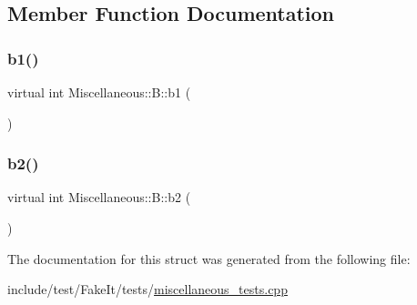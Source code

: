 \subsection{Member Function Documentation}
\mbox{\label{structMiscellaneous_1_1B_ae203b75ca393d9e4709b60c9952c41fc}} 
\subsubsection{\texorpdfstring{b1()}{b1()}}
{\footnotesize\ttfamily virtual int Miscellaneous\+::\+B\+::b1 (\begin{DoxyParamCaption}{ }\end{DoxyParamCaption})\hspace{0.3cm}{\ttfamily [pure virtual]}}

\mbox{\label{structMiscellaneous_1_1B_ae01e13fa5245bd19a2cb0b899f2b5a2e}} 
\subsubsection{\texorpdfstring{b2()}{b2()}}
{\footnotesize\ttfamily virtual int Miscellaneous\+::\+B\+::b2 (\begin{DoxyParamCaption}{ }\end{DoxyParamCaption})\hspace{0.3cm}{\ttfamily [pure virtual]}}



The documentation for this struct was generated from the following file\+:\begin{DoxyCompactItemize}
\item 
include/test/\+Fake\+It/tests/\mbox{\hyperlink{miscellaneous__tests_8cpp}{miscellaneous\+\_\+tests.\+cpp}}\end{DoxyCompactItemize}
